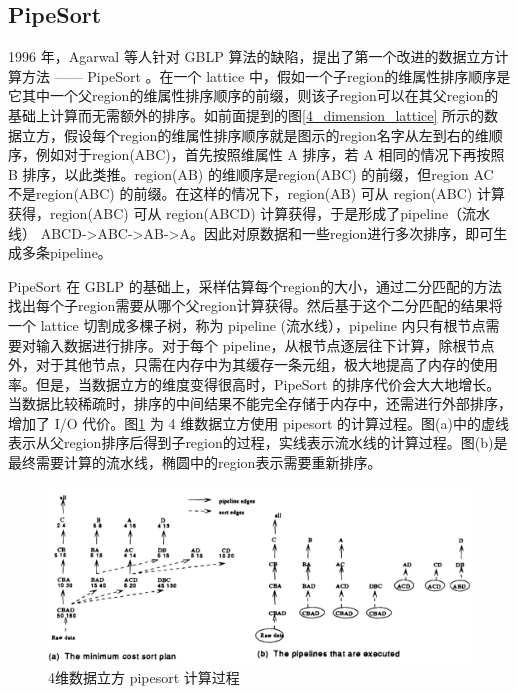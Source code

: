 \subsection{PipeSort}

1996 年，Agarwal 等人针对 GBLP 算法的缺陷，提出了第一个改进的数据立方计算方法 —— PipeSort\cite{agarwal1996computation} 。在一个 lattice 中，假如一个子region的维属性排序顺序是它其中一个父region的维属性排序顺序的前缀，则该子region可以在其父region的基础上计算而无需额外的排序。如前面提到的图\ref{4_dimension_lattice} 所示的数据立方，假设每个region的维属性排序顺序就是图示的region名字从左到右的维顺序，例如对于region(ABC)，首先按照维属性 A 排序，若 A 相同的情况下再按照 B 排序，以此类推。region(AB) 的维顺序是region(ABC) 的前缀，但region AC 不是region(ABC) 的前缀。在这样的情况下，region(AB) 可从 region(ABC) 计算获得，region(ABC) 可从 region(ABCD) 计算获得，于是形成了pipeline（流水线） ABCD-\textgreater ABC-\textgreater AB-\textgreater A。因此对原数据和一些region进行多次排序，即可生成多条pipeline。

PipeSort 在 GBLP 的基础上，采样估算每个region的大小，通过二分匹配的方法找出每个子region需要从哪个父region计算获得。然后基于这个二分匹配的结果将一个 lattice 切割成多棵子树，称为 pipeline (流水线），pipeline 内只有根节点需要对输入数据进行排序。对于每个 pipeline，从根节点逐层往下计算，除根节点外，对于其他节点，只需在内存中为其缓存一条元组，极大地提高了内存的使用率。但是，当数据立方的维度变得很高时，PipeSort 的排序代价会大大地增长。当数据比较稀疏时，排序的中间结果不能完全存储于内存中，还需进行外部排序，增加了 I/O 代价。图\ref{pipesort} 为 4 维数据立方使用 pipesort 的计算过程。图(a)中的虚线表示从父region排序后得到子region的过程，实线表示流水线的计算过程。图(b)是最终需要计算的流水线，椭圆中的region表示需要重新排序。


\begin{figure}[!htb]
\centering\includegraphics[width=5in]{picture/ch_current_research/pipesort} 
\caption{4维数据立方 pipesort 计算过程}\label{pipesort} 
\end{figure} 

